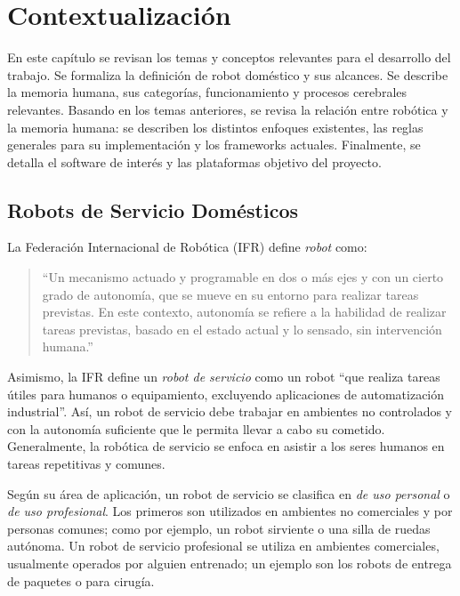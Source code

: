 
\chapter{Contextualización}\label{chapter:context}

En este capítulo se revisan los temas y conceptos relevantes para el desarrollo del trabajo. Se formaliza la definición de robot doméstico y sus alcances. Se describe la memoria humana, sus categorías, funcionamiento y procesos cerebrales relevantes. Basando en los temas anteriores, se revisa la relación entre robótica y la memoria humana: se describen los distintos enfoques existentes, las reglas generales para su implementación y los frameworks actuales. Finalmente, se detalla el software de interés y las plataformas objetivo del proyecto.


\section{Robots de Servicio Domésticos}\label{sec:domestic_robots}

La Federación Internacional de Robótica (IFR) \cite{IFR} define \textit{robot} como:
\begin{quotation}
``Un mecanismo actuado y programable en dos o más ejes y con un cierto grado de autonomía, que se mueve en su entorno para realizar tareas previstas. En este contexto, autonomía se refiere a la habilidad de realizar tareas previstas, basado en el estado actual y lo sensado, sin intervención humana.''
\end{quotation}

Asimismo, la IFR define un \textit{robot de servicio} como un robot ``que realiza tareas útiles para humanos o equipamiento, excluyendo aplicaciones de automatización industrial''. Así, un robot de servicio debe trabajar en ambientes no controlados y con la autonomía suficiente que le permita llevar a cabo su cometido. Generalmente, la robótica de servicio se enfoca en asistir a los seres humanos en tareas repetitivas y comunes.

Según su área de aplicación, un robot de servicio se clasifica en \textit{de uso personal} o \textit{de uso profesional}. Los primeros son utilizados en ambientes no comerciales y por personas comunes; como por ejemplo, un robot sirviente o una silla de ruedas autónoma. Un robot de servicio profesional se utiliza en ambientes comerciales, usualmente operados por alguien entrenado; un ejemplo son los robots de entrega de paquetes o para cirugía.


